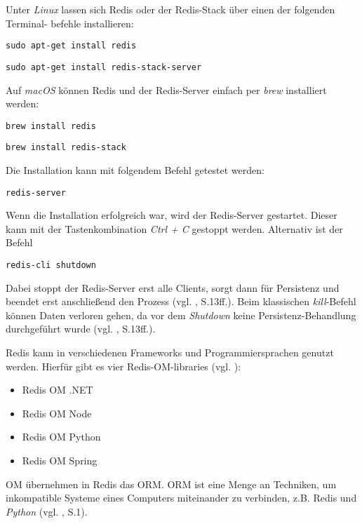 Unter \textit{Linux} lassen sich \ac{Redis} oder der \ac{Redis}-Stack über einen der folgenden Terminal- befehle installieren:

\texttt{sudo apt-get install redis}

\texttt{sudo apt-get install redis-stack-server}

\vspace{0.4cm}

Auf \textit{macOS} können \ac{Redis} und der \ac{Redis}-Server einfach per \textit{brew} installiert werden:

\texttt{brew install redis}

\texttt{brew install redis-stack}

\vspace{0.4cm}

Die Installation kann mit folgendem Befehl getestet werden:

\texttt{redis-server}

Wenn die Installation erfolgreich war, wird der \ac{Redis}-Server gestartet. Dieser kann mit der Tastenkombination \textit{Ctrl + C} gestoppt werden. Alternativ ist der Befehl 

\texttt{redis-cli shutdown} 

Dabei stoppt der \ac{Redis}-Server erst alle Clients, sorgt dann für Persistenz und beendet erst anschließend den Prozess (vgl. \cite{3}, S.13ff.). Beim klassischen \textit{kill}-Befehl können Daten verloren gehen, da vor dem \textit{Shutdown} keine Persistenz-Behandlung durchgeführt wurde (vgl. \cite{3}, S.13ff.).

\ac{Redis} kann in verschiedenen Frameworks und Programmiersprachen genutzt werden. Hierfür gibt es vier \ac{Redis}-\acs{OM}-libraries (vgl. \cite{Redis-Docs-Redis-Stack}): 

\begin{itemize}
	\item Redis OM .NET
	\item Redis OM Node
	\item Redis OM Python
	\item Redis OM Spring
\end{itemize}

\ac{OM} übernehmen in \ac{Redis} das \ac{ORM}. \ac{ORM} ist eine Menge an Techniken, um inkompatible Systeme eines Computers miteinander zu verbinden, z.B. \ac{Redis} und \textit{Python} (vgl. \cite{16}, S.1).






